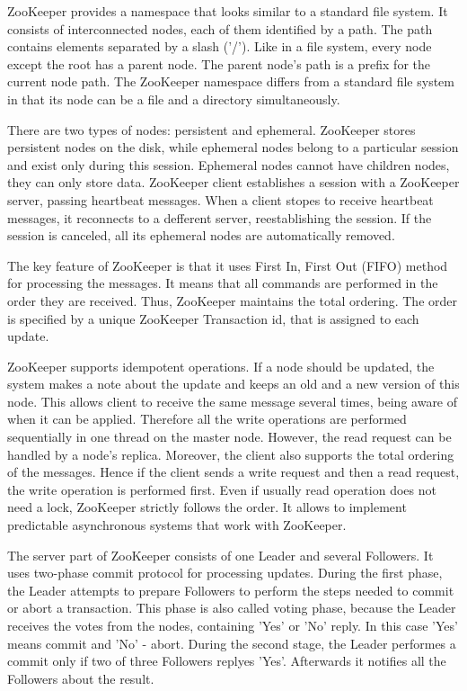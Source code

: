 ZooKeeper provides a namespace that looks similar to a standard file system.
It consists of interconnected nodes, each of them identified by a path.
The path contains elements separated by a slash ('/').
Like in a file system, every node except the root has a parent node.
The parent node's path is a prefix for the current node path.
The ZooKeeper namespace differs from a standard file system in that its node can be a file and a directory simultaneously.

There are two types of nodes: persistent and ephemeral.
ZooKeeper stores persistent nodes on the disk, while ephemeral nodes belong to a particular session and exist only during this session.
Ephemeral nodes cannot have children nodes, they can only store data.
ZooKeeper client establishes a session with a ZooKeeper server, passing heartbeat messages.
When a client stopes to receive heartbeat messages, it reconnects to a defferent server, reestablishing the session.
If the session is canceled, all its ephemeral nodes are automatically removed.

The key feature of ZooKeeper is that it uses First In, First Out (FIFO) method for processing the messages.
It means that all commands are performed in the order they are received.
Thus, ZooKeeper maintains the total ordering.
The order is specified by a unique ZooKeeper Transaction id, that is assigned to each update.
 
ZooKeeper supports idempotent operations.
If a node should be updated, the system makes a note about the update and keeps an old and a new version of this node.
This allows client to receive the same message several times, being aware of when it can be applied.
Therefore all the write operations are performed sequentially in one thread on the master node.
However, the read request can be handled by a node's replica.
Moreover, the client also supports the total ordering of the messages.
Hence if the client sends a write request and then a read request, the write operation is performed first.
Even if usually read operation does not need a lock, ZooKeeper strictly follows the order.
It allows to implement predictable asynchronous systems that work with ZooKeeper.

The server part of ZooKeeper consists of one Leader and several Followers.
It uses two-phase commit protocol for processing updates.
During the first phase, the Leader attempts to prepare Followers to perform the steps needed to commit or abort a transaction.
This phase is also called voting phase, because the Leader receives the votes from the nodes, containing 'Yes' or 'No' reply.
In this case 'Yes' means commit and 'No' - abort.
During the second stage, the Leader performes a commit only if two of three Followers replyes 'Yes'.
Afterwards it notifies all the Followers about the result.

